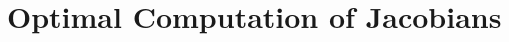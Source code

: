 \documentclass{birkjour}
\numberwithin{equation}{section}
\begin{document}

\section{Optimal Computation of Jacobians}


\end{document}
